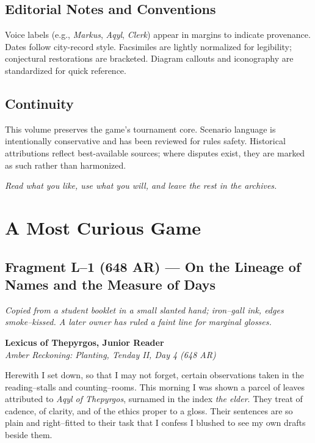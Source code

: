 \documentclass[11pt]{article}
\begin{document}
\subsection{Editorial Notes and Conventions}
Voice labels (e.g., \emph{Markus}, \emph{Aqyl}, \emph{Clerk}) appear in margins to indicate provenance. Dates follow city-record style. Facsimiles are lightly normalized for legibility; conjectural restorations are bracketed. Diagram callouts and iconography are standardized for quick reference.

\subsection{Continuity}
This volume preserves the game’s tournament core. Scenario language is intentionally conservative and has been reviewed for rules safety. Historical attributions reflect best-available sources; where disputes exist, they are marked as such rather than harmonized.

\medskip
\noindent\textit{Read what you like, use what you will, and leave the rest in the archives.}

\clearpage
{}

\section{A Most Curious Game}
\label{sec:curious-game}

\subsection{Fragment L--1 (648 AR) — On the Lineage of Names and the Measure of Days}
\label{frag:l1}

\noindent\textit{Copied from a student booklet in a small slanted hand; iron–gall ink, edges smoke–kissed. A later owner has ruled a faint line for marginal glosses.}

\medskip
\noindent\textbf{Lexicus of Thepyrgos, Junior Reader}\\
\textit{Amber Reckoning: Planting, Tenday II, Day 4 (648 AR)}

Herewith I set down, so that I may not forget, certain observations taken in the reading–stalls and counting–rooms. This morning I was shown a parcel of leaves attributed to \textit{Aqyl of Thepyrgos}, surnamed in the index \textit{the elder}. They treat of cadence, of clarity, and of the ethics proper to a gloss. Their sentences are so plain and right–fitted to their task that I confess I blushed to see my own drafts beside them.
\end{document}
